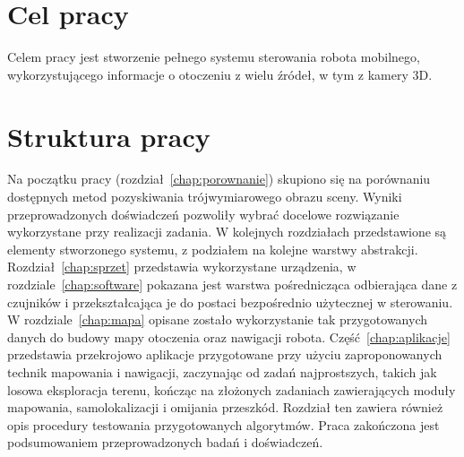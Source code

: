 \section{Cel pracy}

Celem pracy jest stworzenie pełnego systemu sterowania robota mobilnego,
wykorzystującego informacje o otoczeniu z wielu źródeł, w tym z kamery 3D.

\section{Struktura pracy}

Na początku pracy (rozdział~\ref{chap:porownanie}) skupiono się na porównaniu
dostępnych metod pozyskiwania trójwymiarowego
obrazu sceny. Wyniki przeprowadzonych doświadczeń pozwoliły wybrać docelowe rozwiązanie
wykorzystane przy realizacji zadania. W kolejnych rozdziałach przedstawione są elementy
stworzonego systemu, z podziałem na kolejne warstwy abstrakcji. Rozdział~\ref{chap:sprzet}
przedstawia wykorzystane urządzenia, w rozdziale~\ref{chap:software} pokazana jest
warstwa pośrednicząca odbierająca dane z czujników i przekształcająca je do postaci
bezpośrednio użytecznej w sterowaniu. W rozdziale~\ref{chap:mapa} opisane zostało
wykorzystanie tak przygotowanych danych do budowy mapy otoczenia oraz nawigacji robota.
Część~\ref{chap:aplikacje} przedstawia przekrojowo aplikacje przygotowane
przy użyciu zaproponowanych technik mapowania i nawigacji, zaczynając od zadań
najprostszych, takich jak losowa eksploracja terenu, kończąc na złożonych zadaniach
zawierających moduły mapowania, samolokalizacji i omijania przeszkód. Rozdział ten
zawiera również opis procedury testowania przygotowanych algorytmów. Praca zakończona
jest podsumowaniem przeprowadzonych badań i doświadczeń.


